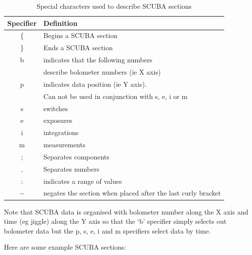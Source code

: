 \documentclass[twoside,11pt]{article}
\renewcommand{\_}{\texttt{\symbol{95}}}
\begin{document}
\begin{table}
\begin{center}
\begin{tabular}{cl}
\hline \hline
Specifier & Definition \\ \hline
\{  & Begins a SCUBA section \\
\}  & Ends a SCUBA section   \\
b  & indicates that the following numbers \\
   & describe bolometer numbers (ie X axis)\\
p  & indicates data position (ie Y axis). \\
   & Can not be used in conjunction with s, e, i or m\\
s  & switches \\
e  & exposures \\
i  & integrations \\
m  & measurements \\
;  & Separates components   \\
,  & Separates numbers \\
:  & indicates a range of values \\
$-$& negates the section when placed after the last curly bracket \\ \hline
\hline
\end{tabular}

\caption{Special characters used to describe SCUBA sections}

\label{scusect}
\end{center}
\end{table}

Note that SCUBA data is organised with bolometer number along the 
X axis and time (eg jiggle) along the Y axis so  that the `b' specifier
simply selects out bolometer data but the p, s, e, i and m specifiers select
data by time.

Here are some example SCUBA sections:
\end{document}
